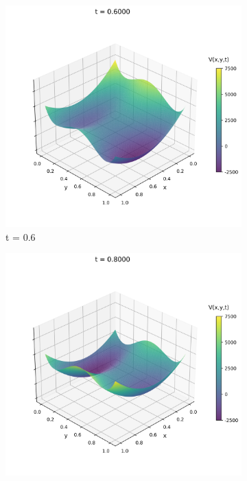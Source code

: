 \documentclass{article}
\theoremstyle{definition}
\theoremstyle{plain}
\theoremstyle{remark}
\begin{document}
\begin{figure}[h]
  \begin{subfigure}[b]{0.3\textwidth}
    \centering
    \includegraphics[width=\textwidth, trim=0cm 0cm 0cm 1cm, clip]{figures/potential_frame_0030.png}
    \caption{t = 0.6}
  \end{subfigure}
  \hfill
  \begin{subfigure}[b]{0.3\textwidth}
    \centering
    \includegraphics[width=\textwidth, trim=0cm 0cm 0cm 1cm, clip]{figures/potential_frame_0040.png}

\end{subfigure}
\end{figure}
\end{document}
